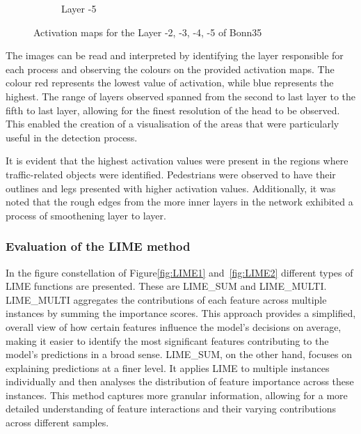 \begin{figure}[h]
\begin{subfigure}[b]{0.49\textwidth}
        \caption{Layer -5}
        \label{fig:-5}
    \end{subfigure}
    \hfill

    \caption{Activation maps for the Layer -2, -3, -4, -5 of Bonn35}
    \label{fig:Bonn_000035_000019}
\end{figure}

The images can be read and interpreted by identifying the layer responsible for each process and observing the colours on the provided activation maps.
The colour red represents the lowest value of activation, while blue represents the highest.
The range of layers observed spanned from the second to last layer to the fifth to last layer,
allowing for the finest resolution of the head to be observed.
This enabled the creation of a visualisation of the areas that were particularly useful in the detection process.

It is evident that the highest activation values were present in the regions where traffic-related objects were identified.
Pedestrians were observed to have their outlines and legs presented with higher activation values.
Additionally, it was noted that the rough edges from the more inner layers in the network exhibited a process of smoothening layer to layer.

\subsubsection{Evaluation of the LIME method}\label{subsubsec:evaluation-of-the-lime-method}
In the figure constellation of Figure\ref{fig:LIME1} and~\ref{fig:LIME2} different types of LIME functions are presented.
These are LIME\_SUM and LIME\_MULTI\@.
LIME\_MULTI aggregates the contributions of each feature across multiple instances by summing the importance scores.
This approach provides a simplified, overall view of how certain features influence the model's decisions on average,
making it easier to identify the most significant features contributing to the model's predictions in a broad sense.
LIME\_SUM, on the other hand, focuses on explaining predictions at a finer level.
It applies LIME to multiple instances individually and then analyses the distribution of feature importance across these instances.
This method captures more granular information, allowing for a more detailed understanding of feature interactions and their varying contributions across different samples.

